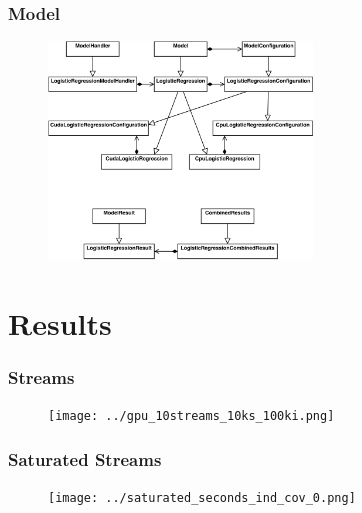\documentclass{beamer}
\begin{document}
\begin{frame}
\frametitle{Model}

\begin{figure}[h]
    \centering
    \includegraphics[width=7cm]{../lr_structure.png}
\end{figure}

\end{frame}

\section{Results}



\begin{frame}
\frametitle{Streams}

\begin{figure}[h]
    \centering
    \texttt{[image: ../gpu\_10streams\_10ks\_100ki.png]}
\end{figure}

\end{frame}


\begin{frame}
\frametitle{Saturated Streams}

\begin{figure}[h]
    \centering
    \texttt{[image: ../saturated\_seconds\_ind\_cov\_0.png]}
\end{figure}

\end{frame}
\end{document}
